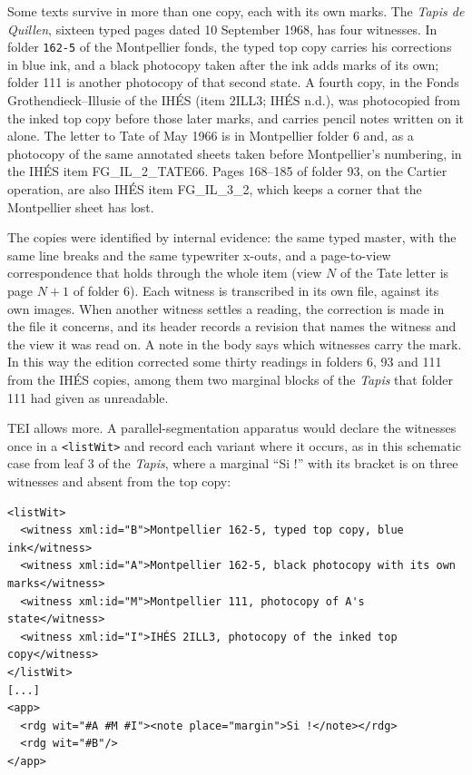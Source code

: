 \documentclass[11pt]{article}
\newcommand{\qq}[1]{“#1”}
\begin{document}
Some texts survive in more than one copy, each with its own marks. The \emph{Tapis de Quillen}, sixteen typed pages dated 10 September 1968, has four witnesses. In folder \texttt{162-5} of the Montpellier fonds, the typed top copy carries his corrections in blue ink, and a black photocopy taken after the ink adds marks of its own; folder 111 is another photocopy of that second state. A fourth copy, in the Fonds Grothendieck--Illusie of the IHÉS (item 2ILL3; IHÉS n.d.), was photocopied from the inked top copy before those later marks, and carries pencil notes written on it alone. The letter to Tate of May 1966 is in Montpellier folder 6 and, as a photocopy of the same annotated sheets taken before Montpellier's numbering, in the IHÉS item FG\_IL\_2\_TATE66. Pages 168--185 of folder 93, on the Cartier operation, are also IHÉS item FG\_IL\_3\_2, which keeps a corner that the Montpellier sheet has lost.

The copies were identified by internal evidence: the same typed master, with the same line breaks and the same typewriter x-outs, and a page-to-view correspondence that holds through the whole item (view \(N\) of the Tate letter is page \(N+1\) of folder 6). Each witness is transcribed in its own file, against its own images. When another witness settles a reading, the correction is made in the file it concerns, and its header records a revision that names the witness and the view it was read on. A note in the body says which witnesses carry the mark. In this way the edition corrected some thirty readings in folders 6, 93 and 111 from the IHÉS copies, among them two marginal blocks of the \emph{Tapis} that folder 111 had given as unreadable.

TEI allows more. A parallel-segmentation apparatus would declare the witnesses once in a \texttt{<listWit>} and record each variant where it occurs, as in this schematic case from leaf 3 of the \emph{Tapis}, where a marginal \qq{Si !} with its bracket is on three witnesses and absent from the top copy:

\begin{lstlisting}
<listWit>
  <witness xml:id="B">Montpellier 162-5, typed top copy, blue ink</witness>
  <witness xml:id="A">Montpellier 162-5, black photocopy with its own marks</witness>
  <witness xml:id="M">Montpellier 111, photocopy of A's state</witness>
  <witness xml:id="I">IHÉS 2ILL3, photocopy of the inked top copy</witness>
</listWit>
[...]
<app>
  <rdg wit="#A #M #I"><note place="margin">Si !</note></rdg>
  <rdg wit="#B"/>
</app>
\end{lstlisting}
\end{document}
